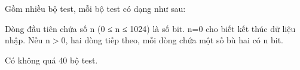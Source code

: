 Gồm nhiều bộ test, mỗi bộ test có dạng như sau:

Dòng đầu tiên chứa số n (0 ≤ n ≤ 1024) là số bit. n=0 cho biết kết thúc dữ liệu nhập. Nếu n$>$0, hai dòng tiếp theo, mỗi dòng chứa một số bù hai có n bit.

Có không quá 40 bộ test.